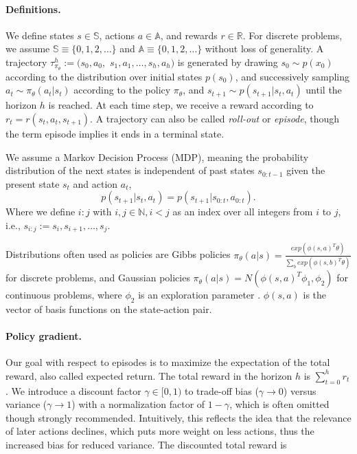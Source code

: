 \paragraph{Definitions.} 
We define states $s \in \mathbb{S}$, actions $a \in \mathbb{A}$, and rewards $r \in \mathbb{R}$. 
For discrete problems, we assume $\mathbb{S} \equiv \{0,1,2,\ldots\}$ and $\mathbb{A} \equiv \{0,1,2,\ldots\}$ without loss of generality.
A trajectory $\tau_{\pi_\theta}^h := (s_0, a_0, $ $s_1, a_1, \dots, s_h, a_h)$ is generated by drawing $s_0 \sim p(x_0)$ according to the distribution over initial states $p(s_0)$, and successively sampling $a_t \sim \pi_\theta(a_t|s_t)$ according to the policy $\pi_\theta$, and $s_{t+1} \sim p(s_{t+1}|s_t,a_t)$ until the horizon $h$ is reached. 
At each time step, we receive a reward according to $r_t = r(s_t, a_t, s_{t+1})$. 
A trajectory can also be called \textit{roll-out} or \textit{episode}, though the term episode implies it ends in a terminal state.

We assume a Markov Decision Process (MDP), meaning the probability distribution of the next states is independent of past states $s_{0:t-1}$ given the present state $s_t$ and action $a_t$, 
\begin{equation}
	p(s_{t+1}|s_t,a_t)=p(s_{t+1}|s_{0:t},a_{0:t}).
\end{equation}
Where we define $i:j$ with $i,j \in \mathbb{N}, i < j$ as an index over all integers from $i$ to $j$, i.e., $s_{i:j} := s_i, s_{i+1}, \dots, s_j$. 

Distributions often used as policies are Gibbs policies $\pi_\theta(a|s) = \frac{exp(\phi(s,a)^T\theta)}{\sum_b exp(\phi(s,b)^T\theta)}$ \cite{Sutton:1999:PGM:3009657.3009806,Bagnell2004LearningD} for discrete problems, and Gaussian policies $\pi_\theta(a|s) = N(\phi(s,a)^T\phi_1,\phi_2)$ for continuous problems, where $\phi_2$ is an exploration parameter \cite{Williams92simplestatistical,peter:article:1996}. 
$\phi(s,a)$ is the vector of basis functions on the state-action pair.

\paragraph{Policy gradient.} 
Our goal with respect to episodes is to maximize the expectation of the total reward, also called expected return. 
The total reward in the horizon $h$ is $\sum_{t=0}^{h} r_{t}$. 
We introduce a discount factor $\gamma \in [0,1)$ to trade-off bias ($\gamma\to0$) versus variance ($\gamma\to1$) with a normalization factor of $1-\gamma$, which is often omitted though strongly recommended.
Intuitively, this reflects the idea that the relevance of later actions declines, which puts more weight on less actions, thus the increased bias for reduced variance. 
The discounted total reward is 

